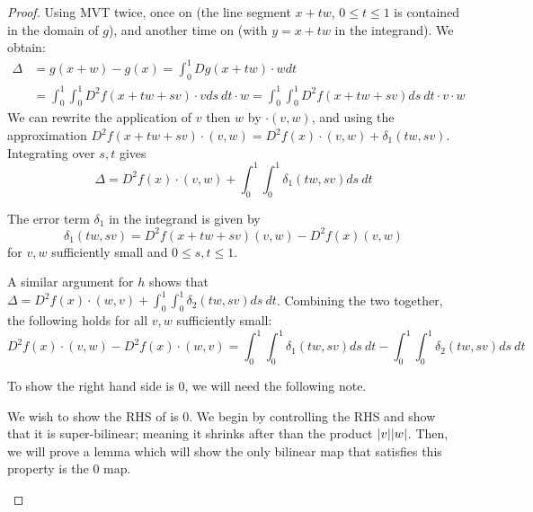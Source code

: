 \documentclass[../main-v2-manifolds.tex]{subfiles}
\begin{document}
\begin{proof}
    Using MVT twice, once on  (the line segment $x + tw$, $0\leq t\leq 1$ is contained in the domain of $g$), and another time on  (with $y = x+tw$ in the integrand). We obtain:
    \begin{align*}
        \Delta &= g(x+w) - g(x)= \int_{0}^1 Dg(x+tw)\cdot w dt\\[1ex]
        &= \int_0^1\int_0^1 D^2f(x + tw+sv)\cdot v ds\: dt \cdot w= \int_0^1\int_0^1 D^2f(x + tw + sv) ds\: dt \cdot v\cdot w
    \end{align*}
    We can rewrite the application of $v$ then $w$ by $\cdot (v,w)$, and using the approximation $D^2f(x+tw+sv)\cdot(v,w) = D^2f(x)\cdot(v,w)+\delta_1(tw,sv)$. Integrating over $s,t$ gives
    \[
        \Delta = D^2f(x)\cdot(v,w) + \int_0^1\int_0^1 \delta_1(tw,sv) ds\: dt
    \]
    \begin{note}
        The error term $\delta_1$ in the integrand is given by
        \[
            \delta_1(tw,sv) = D^2f(x + tw + sv)(v,w) - D^2f(x)(v,w)
        \]
        for $v,w$ sufficiently small and $0 \leq s,t\leq 1$.
    \end{note}

    A similar argument for $h$ shows that $\Delta = D^2f(x)\cdot(w,v) + \int_0^1\int_0^1 \delta_2(tw,sv)ds\: dt$. Combining the two together, the following holds for all $v,w$ sufficiently small:
    \begin{equation}\label{second-derivative-lie-bracket}
        D^2f(x)\cdot (v,w) - D^2f(x)\cdot (w,v) = \int_0^1\int_0^1 \delta_1(tw,sv)ds\: dt - \int_0^1\int_0^1 \delta_2(tw,sv)ds\: dt
    \end{equation}

    To show the right hand side is $0$, we will need the following note. 

    \begin{note}
    We wish to show the RHS of  is $0$. We begin by controlling the RHS and show that it is super-bilinear; meaning it shrinks after than the product $\vert {v} \vert\vert {w} \vert$. Then, we will prove a lemma which will show the only bilinear map that satisfies this property is the $0$ map.


\end{note}
\end{proof}
\end{document}
